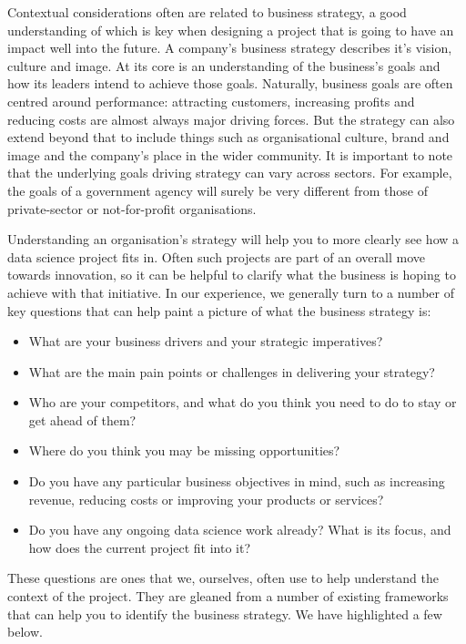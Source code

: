 \documentclass[
]{book}
\providecommand{\tightlist}{%
  \setlength{\itemsep}{0pt}\setlength{\parskip}{0pt}}
\begin{document}
Contextual considerations often are related to business strategy, a good understanding of which is key when designing a project that is going to have an impact well into the future. A company's business strategy describes it's vision, culture and image. At its core is an understanding of the business's goals and how its leaders intend to achieve those goals. Naturally, business goals are often centred around performance: attracting customers, increasing profits and reducing costs are almost always major driving forces. But the strategy can also extend beyond that to include things such as organisational culture, brand and image and the company's place in the wider community. It is important to note that the underlying goals driving strategy can vary across sectors. For example, the goals of a government agency will surely be very different from those of private-sector or not-for-profit organisations.

Understanding an organisation's strategy will help you to more clearly see how a data science project fits in. Often such projects are part of an overall move towards innovation, so it can be helpful to clarify what the business is hoping to achieve with that initiative. In our experience, we generally turn to a number of key questions that can help paint a picture of what the business strategy is:

\begin{itemize}
\tightlist
\item
  What are your business drivers and your strategic imperatives?
\item
  What are the main pain points or challenges in delivering your strategy?
\item
  Who are your competitors, and what do you think you need to do to stay or get ahead of them?
\item
  Where do you think you may be missing opportunities?
\item
  Do you have any particular business objectives in mind, such as increasing revenue, reducing costs or improving your products or services?
\item
  Do you have any ongoing data science work already? What is its focus, and how does the current project fit into it?
\end{itemize}

These questions are ones that we, ourselves, often use to help understand the context of the project. They are gleaned from a number of existing frameworks that can help you to identify the business strategy. We have highlighted a few below.
\end{document}
